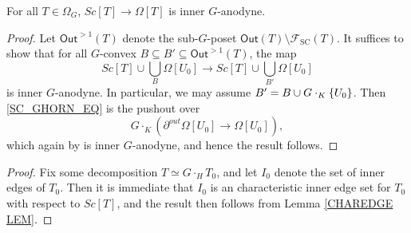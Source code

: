 \documentclass[a4paper,10pt,draft]{article}%
\begin{document}
\begin{proposition}
      \label{SC_IN_GHORN_PROP}
      For all $T \in \Omega_G$, $Sc[T] \to \Omega[T]$ is inner $G$-anodyne.
\end{proposition}
{\color{blue} %
\begin{proof}
      Let $\mathsf{Out}^{>1}(T)$ denote the sub-$G$-poset $\mathsf{Out}(T) \setminus \mathscr{F}_{\mathrm{SC}}(T)$.
      It suffices to show that for all $G$-convex $B \subseteq B' \subseteq \mathsf{Out}^{>1}(T)$, the map
      \begin{equation}
            \label{SC_GHORN_EQ}
            Sc[T] \cup \mathop{\bigcup}\limits_{B}\Omega[U_0]
            \to
            Sc[T] \cup \mathop{\bigcup}\limits_{B'}\Omega[U_0]
      \end{equation}
      is inner $G$-anodyne. In particular, we may assume $B' = B \cup G \cdot_K \left\{U_0\right\}$.
      Then \eqref{SC_GHORN_EQ} is the pushout over
      \begin{equation}
                  G\cdot_K \left(\partial^{out}\Omega[U_0] \to \Omega[U_0] \right),
      \end{equation}
      which again by \cite[Proposition 6.17]{Per17} is inner $G$-anodyne, and hence the result follows.
\end{proof}
} %
\begin{proof}
      Fix some decomposition $T \simeq G \cdot_H T_0$, and let $I_0$ denote the set of inner edges of $T_0$.
      Then it is immediate that $I_0$ is an characteristic inner edge set for $T_0$ with respect to $Sc[T]$,
      and the result then follows from Lemma \ref{CHAREDGE LEM}.
\end{proof}
\end{document}
